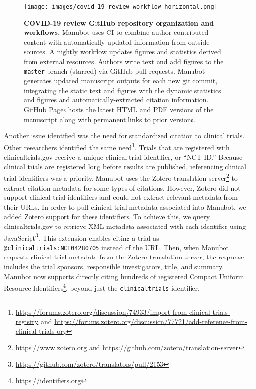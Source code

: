 \documentclass[twocolumn]{ceurart}
\begin{document}
\begin{figure}
\hypertarget{fig:manubot-workflow}{%
\centering
\texttt{[image: images/covid-19-review-workflow-horizontal.png]}
\caption{\textbf{COVID-19 review GitHub repository organization and workflows.}
Manubot uses CI to combine author-contributed content with automatically updated information from outside sources.
A nightly workflow updates figures and statistics derived from external resources.
Authors write text and add figures to the \texttt{master} branch (starred) via GitHub pull requests.
Manubot generates updated manuscript outputs for each new git commit, integrating the static text and figures with the dynamic statistics and figures and automatically-extracted citation information.
GitHub Pages hosts the latest HTML and PDF versions of the manuscript along with permanent links to prior versions.}\label{fig:manubot-workflow}
}
\end{figure}

Another issue identified was the need for standardized citation to clinical trials.
Other researchers identified the same need\footnote{\url{https://forums.zotero.org/discussion/74933/import-from-clinical-trials-registry} and \url{https://forums.zotero.org/discussion/77721/add-reference-from-clinical-trials-org}}.
Trials that are registered with clinicaltrials.gov receive a unique clinical trial identifier, or ``NCT ID.''
Because clinical trials are registered long before results are published, referencing clinical trial identifiers was a priority.
Manubot uses the Zotero translation server\footnote{\url{https://www.zotero.org} and \url{https://github.com/zotero/translation-server}} to extract citation metadata for some types of citations.
However, Zotero did not support clinical trial identifiers and could not extract relevant metadata from their URLs.
In order to pull clinical trial metadata associated into Manubot, we added Zotero support for these identifiers.
To achieve this, we query clinicaltrials.gov to retrieve XML metadata associated with each identifier using JavaScript\footnote{\url{https://github.com/zotero/translators/pull/2153}}.
This extension enables citing a trial as \texttt{@clinicaltrials:NCT04280705} instead of the URL.
Then, when Manubot requests clinical trial metadata from the Zotero translation server, the response includes the trial sponsors, responsible investigators, title, and summary.
Manubot now supports directly citing hundreds of registered Compact Uniform Resource Identifiers\footnote{\url{https://identifiers.org}}, beyond just the \texttt{clinicaltrials} identifier.
\end{document}
